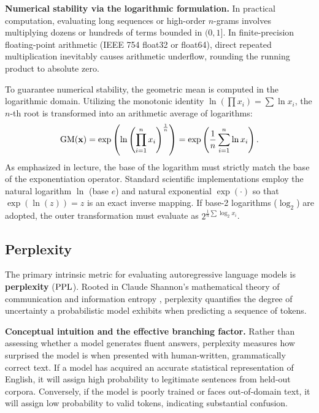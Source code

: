 \documentclass[../../main.tex]{subfiles}
\begin{document}
\noindent\textbf{Numerical stability via the logarithmic formulation.}\newline
In practical computation, evaluating long sequences or high-order $n$-grams involves multiplying dozens or hundreds of terms bounded in $(0, 1]$. In finite-precision floating-point arithmetic (IEEE 754 float32 or float64), direct repeated multiplication inevitably causes arithmetic underflow, rounding the running product to absolute zero.

To guarantee numerical stability, the geometric mean is computed in the logarithmic domain. Utilizing the monotonic identity $\ln\left(\prod x_i\right) = \sum \ln x_i$, the $n$-th root is transformed into an arithmetic average of logarithms:
\begin{equation}
\label{eq:geometric_mean_log_trick}
\mathrm{GM}(\mathbf{x}) = \exp\left( \ln\left( \prod_{i=1}^n x_i \right)^{\frac{1}{n}} \right) = \exp\left( \frac{1}{n} \sum_{i=1}^n \ln x_i \right).
\end{equation}
As emphasized in lecture, the base of the logarithm must strictly match the base of the exponentiation operator. Standard scientific implementations employ the natural logarithm $\ln$ (base $e$) and natural exponential $\exp(\cdot)$ so that $\exp(\ln(z)) = z$ is an exact inverse mapping. If base-2 logarithms ($\log_2$) are adopted, the outer transformation must evaluate as $2^{\frac{1}{n} \sum \log_2 x_i}$.

\subsection{Perplexity}
\label{subsec:perplexity}

The primary intrinsic metric for evaluating autoregressive language models is \textbf{perplexity} ($\mathrm{PPL}$). Rooted in Claude Shannon's mathematical theory of communication and information entropy \cite{shannon1948}, perplexity quantifies the degree of uncertainty a probabilistic model exhibits when predicting a sequence of tokens.

\noindent\textbf{Conceptual intuition and the effective branching factor.}\newline
Rather than assessing whether a model generates fluent answers, perplexity measures how surprised the model is when presented with human-written, grammatically correct text. If a model has acquired an accurate statistical representation of English, it will assign high probability to legitimate sentences from held-out corpora. Conversely, if the model is poorly trained or faces out-of-domain text, it will assign low probability to valid tokens, indicating substantial confusion.
\end{document}
